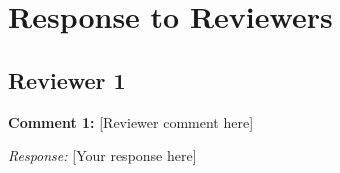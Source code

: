 \section*{Response to Reviewers}

\subsection*{Reviewer 1}

\textbf{Comment 1:} [Reviewer comment here]

\textit{Response:} [Your response here]

